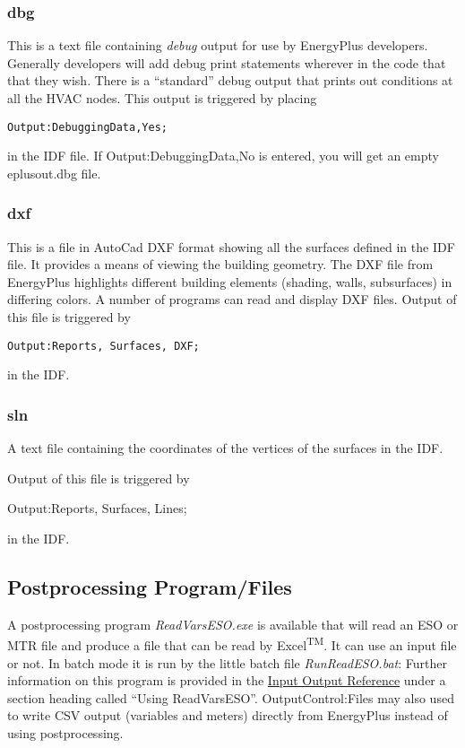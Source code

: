 \subsubsection{dbg}\label{dbg}

This is a text file containing \emph{debug} output for use by EnergyPlus developers. Generally developers will add debug print statements wherever in the code that that they wish. There is a ``standard'' debug output that prints out conditions at all the HVAC nodes. This output is triggered by placing

\begin{lstlisting}
Output:DebuggingData,Yes;
\end{lstlisting}

in the IDF file. If Output:DebuggingData,No is entered, you will get an empty eplusout.dbg file.

\subsubsection{dxf}\label{dxf}

This is a file in AutoCad DXF format showing all the surfaces defined in the IDF file. It provides a means of viewing the building geometry. The DXF file from EnergyPlus highlights different building elements (shading, walls, subsurfaces) in differing colors. A number of programs can read and display DXF files. Output of this file is triggered by

\begin{lstlisting}
Output:Reports, Surfaces, DXF;
\end{lstlisting}

in the IDF.

\subsubsection{sln}\label{sln}

A text file containing the coordinates of the vertices of the surfaces in the IDF.

Output of this file is triggered by

Output:Reports, Surfaces, Lines;

in the IDF.

\subsection{Postprocessing Program/Files}\label{postprocessing-programfiles}

A postprocessing program \emph{ReadVarsESO.exe} is available that will read an ESO or MTR file and produce a file that can be read by Excel\textsuperscript{TM}. It can use an input file or not. In batch mode it is run by the little batch file \emph{RunReadESO.bat}: Further information on this program is provided in the \href{InputOutputReference.pdf}{Input Output Reference} under a section heading called ``Using ReadVarsESO''. OutputControl:Files may also used to write CSV output (variables and meters) directly from EnergyPlus instead of using postprocessing.


